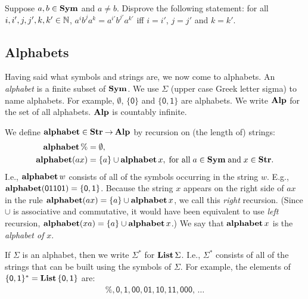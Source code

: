 \begin{exercise}
Suppose $a,b\in\mathbf{Sym}$ and $a\neq b$. Disprove the following statement:
for all $i, i', j, j', k, k'\in\mathbb{N}$, $a^i b^j a^k = a^{i'} b^{j'} a^{k'}$
iff $i = i'$, $j = j'$ and $k = k'$.
\end{exercise}

%

\subsection{Alphabets}

%
Having said what symbols and strings are, we now come to alphabets.
An \emph{alphabet}
%
is a finite subset of $\mathbf{Sym}$.  We use $\Sigma$
%
%
(upper case Greek letter sigma) to name alphabets.  For example,
$\emptyset$, $\mathsf{\{0\}}$ and $\mathsf{\{0,1\}}$ are alphabets.
We write $\mathbf{Alp}$ for the set of all alphabets.  $\mathbf{Alp}$ is countably
infinite.
%

We define $\mathbf{alphabet}\in\mathbf{Str}\mathbin{\to}\mathbf{Alp}$
%
%
%
by recursion
%
%
%
on (the length of) strings:
\begin{align*}
\mathbf{alphabet}\,\% &= \emptyset , \\
\mathbf{alphabet}(ax) &= \{a\} \cup \mathbf{alphabet}\,x,
\;\allowbreak\mbox{for all}\allowbreak\;a\in\mathbf{Sym}\;\allowbreak\mbox{and}\allowbreak\;x\in\mathbf{Str} .
\end{align*}
I.e., $\mathbf{alphabet}\,w$ consists of all of the symbols occurring in the
string $w$.  E.g., $\mathbf{alphabet}(\mathsf{01101})=\{\mathsf{0},\mathsf{1}\}$.
Because the string $x$ appears on the right side of $ax$ in the rule
$\mathbf{alphabet}(ax) = \{a\} \cup \mathbf{alphabet}\,x$, we call this \emph{right}
recursion.  (Since $\cup$ is associative and commutative, it would
have been equivalent to use \emph{left} recursion, $\mathbf{alphabet}(xa) =
\{a\} \cup \mathbf{alphabet}\,x$.)  We say that $\mathbf{alphabet}\,x$ is the
\emph{alphabet of} $x$.

If $\Sigma$ is an alphabet, then we write $\Sigma^*$
%
%
for $\mathbf{List}\,\Sigma$.
I.e., $\Sigma^*$ consists of all of the strings that can be built
using the symbols of $\Sigma$.
For example, the elements of $\mathsf{\{0,1\}^*} = \mathbf{List}\,\mathsf{\{0,1\}}$ are:
\begin{gather*}
\%, \mathsf{0}, \mathsf{1}, \mathsf{00}, \mathsf{01}, \mathsf{10},
\mathsf{11},\mathsf{000},\, \ldots
\end{gather*}
%

